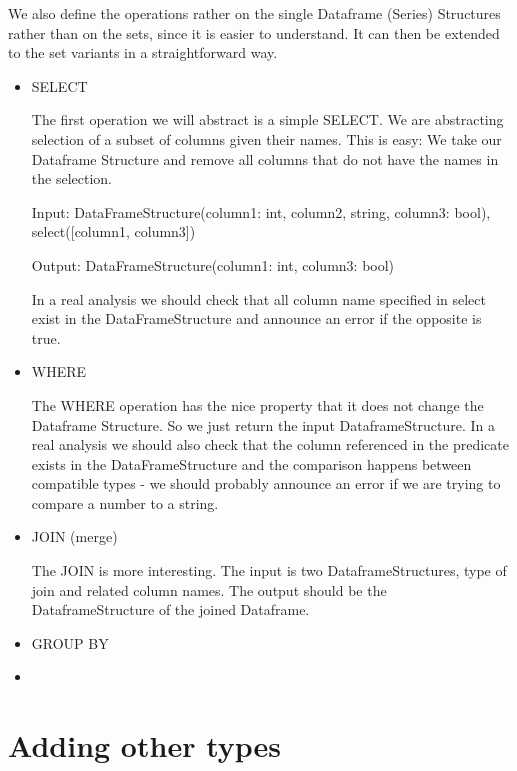 We also define the operations rather on the single Dataframe (Series) Structures rather than on the sets, since it is
easier to understand.
It can then be extended to the set variants in a straightforward way. 

\begin{itemize}
    \item SELECT

    The first operation we will abstract is a simple SELECT\@.
    We are abstracting selection of a subset of columns given their names.
    This is easy: We take our Dataframe Structure and remove all columns that do not have the names in the selection.
    \begin{example}

        Input: DataFrameStructure(column1: int, column2, string, column3: bool), select([column1, column3])

        Output: DataFrameStructure(column1: int, column3: bool)
    \end{example}
    In a real analysis we should check that all column name specified in select exist in the DataFrameStructure and
    announce an error if the opposite is true.

    \item WHERE

    The WHERE operation has the nice property that it does not change the Dataframe Structure.
    So we just return the input DataframeStructure.
    In a real analysis we should also check that the column referenced in the predicate exists in the DataFrameStructure
    and the comparison happens between compatible types - we should probably announce an error if we are trying to compare
    a number to a string.

    \item JOIN (merge)

    The JOIN is more interesting.
    The input is two DataframeStructures, type of join and related column names.
    The output should be the DataframeStructure of the joined Dataframe.

    \item GROUP BY



    \item {}


\end{itemize}

\section{Adding other types}

